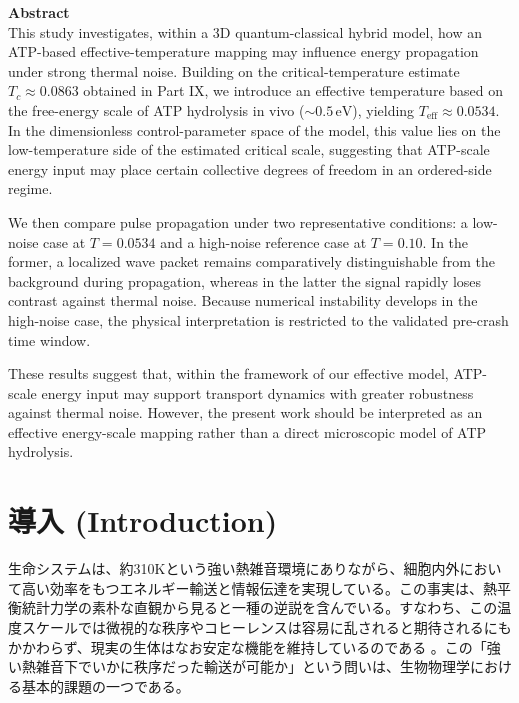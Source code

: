 \documentclass[a4paper,11pt,ja=standard,lualatex]{bxjsarticle}
\begin{document}
\vspace{1em}

\noindent\textbf{Abstract}\\
\small
This study investigates, within a 3D quantum-classical hybrid model, how an ATP-based effective-temperature mapping may influence energy propagation under strong thermal noise. Building on the critical-temperature estimate $T_c \approx 0.0863$ obtained in Part IX, we introduce an effective temperature based on the free-energy scale of ATP hydrolysis in vivo ($\sim 0.5\,\mathrm{eV}$), yielding $T_{\mathrm{eff}} \approx 0.0534$. In the dimensionless control-parameter space of the model, this value lies on the low-temperature side of the estimated critical scale, suggesting that ATP-scale energy input may place certain collective degrees of freedom in an ordered-side regime.

We then compare pulse propagation under two representative conditions: a low-noise case at $T=0.0534$ and a high-noise reference case at $T=0.10$. In the former, a localized wave packet remains comparatively distinguishable from the background during propagation, whereas in the latter the signal rapidly loses contrast against thermal noise. Because numerical instability develops in the high-noise case, the physical interpretation is restricted to the validated pre-crash time window.

These results suggest that, within the framework of our effective model, ATP-scale energy input may support transport dynamics with greater robustness against thermal noise. However, the present work should be interpreted as an effective energy-scale mapping rather than a direct microscopic model of ATP hydrolysis.
\normalsize

\FloatBarrier

\section{導入 (Introduction)}
\label{sec:introduction}
生命システムは、約310Kという強い熱雑音環境にありながら、細胞内外において高い効率をもつエネルギー輸送と情報伝達を実現している。この事実は、熱平衡統計力学の素朴な直観から見ると一種の逆説を含んでいる。すなわち、この温度スケールでは微視的な秩序やコヒーレンスは容易に乱されると期待されるにもかかわらず、現実の生体はなお安定な機能を維持しているのである \cite{Lindner2004}。この「強い熱雑音下でいかに秩序だった輸送が可能か」という問いは、生物物理学における基本的課題の一つである。
\end{document}
